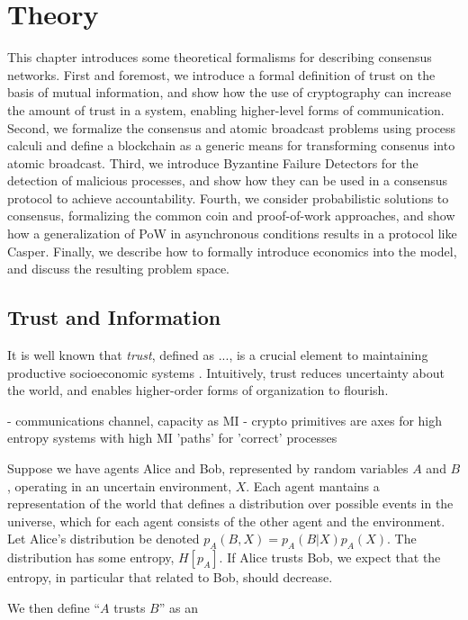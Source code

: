 \chapter{Theory}

This chapter introduces some theoretical formalisms for describing consensus networks.
First and foremost, we introduce a formal definition of trust on the basis of mutual information,
and show how the use of cryptography can increase the amount of trust in a system, 
enabling higher-level forms of communication.
Second, we formalize the consensus and atomic broadcast problems using process calculi 
and define a blockchain as a generic means for transforming consenus into atomic broadcast.
Third, we introduce Byzantine Failure Detectors for the detection of malicious processes,
and show how they can be used in a consensus protocol to achieve accountability.
Fourth, we consider probabilistic solutions to consensus, formalizing the common coin and proof-of-work approaches,
and show how a generalization of PoW in asynchronous conditions results in a protocol like Casper.
Finally, we describe how to formally introduce economics into the model, and discuss the resulting problem space.

\section{Trust and Information}

It is well known that \emph{trust}, defined as ...,
is a crucial element to maintaining productive socioeconomic systems \cite{trust}.
Intuitively, trust reduces uncertainty about the world, 
and enables higher-order forms of organization to flourish.

- communications channel, capacity as MI
- crypto primitives are axes for high entropy systems with high MI 'paths' for 'correct' processes



Suppose we have agents Alice and Bob, represented by random variables $A$ and $B$, 
operating in an uncertain environment, $X$.
Each agent mantains a representation of the world that defines a distribution over possible events 
in the universe, which for each agent consists of the other agent and the environment.
Let Alice's distribution be denoted $p_A(B, X) = p_A(B | X)p_A(X) $. 
The distribution has some entropy, $H[p_A]$. 
If Alice trusts Bob, we expect that the entropy, in particular that related to Bob, should decrease. 


We then define ``$A$ trusts $B$'' as an


